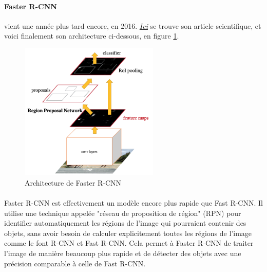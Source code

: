 
\paragraph{Faster R-CNN} vient une année plus tard encore, en 2016.  \href{https://arxiv.org/pdf/1506.01497.pdf}{\textit{Ici}} se trouve son article scientifique, et voici finalement son architecture ci-dessous, en figure \ref{fig:fasterRcnn_architecture}.

\begin{figure}[H]
    \centering
    \includegraphics[width=250px]{images/model_fasterRcnn_architecture.png}
    \caption{Architecture de Faster R-CNN}
    \label{fig:fasterRcnn_architecture}
\end{figure}

\paragraph{} Faster R-CNN est effectivement un modèle encore plus rapide que Fast R-CNN. Il utilise une technique appelée "réseau de proposition de région" (RPN) pour identifier automatiquement les régions de l'image qui pourraient contenir des objets, sans avoir besoin de calculer explicitement toutes les régions de l'image comme le font R-CNN et Fast R-CNN. Cela permet à Faster R-CNN de traiter l'image de manière beaucoup plus rapide et de détecter des objets avec une précision comparable à celle de Fast R-CNN.

